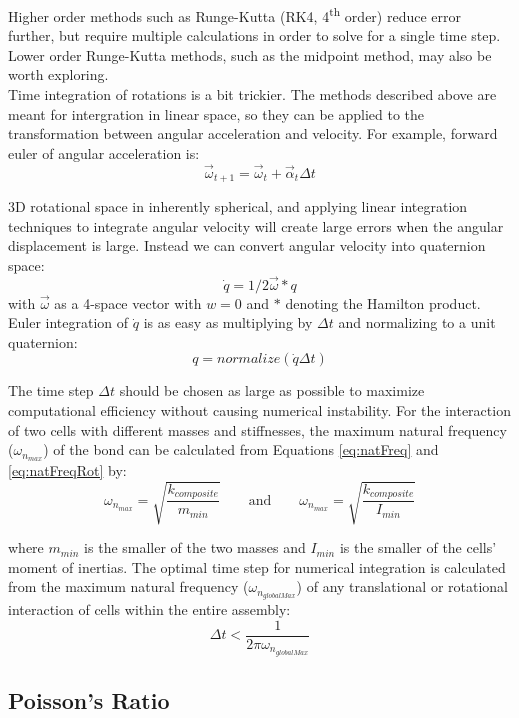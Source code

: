 {Higher order methods such as Runge-Kutta (RK4, 4\textsuperscript{th} order) reduce error further, but require multiple calculations in order to solve for a single time step.  Lower order Runge-Kutta methods, such as the midpoint method, may also be worth exploring.\\

Time integration of rotations is a bit trickier.  The methods described above are meant for intergration in linear space, so they can be applied to the transformation between angular acceleration and velocity.  For example, forward euler of angular acceleration is:
\[ \vec{\omega}_{t+1} = \vec{\omega}_{t} +  \vec{\alpha}_{t}\Delta t\]

3D rotational space in inherently spherical, and applying linear integration techniques to integrate angular velocity will create large errors when the angular displacement is large.  Instead we can convert angular velocity into quaternion space:
\[ \dot{q} = 1/2\vec{\omega}*q\]
with $\vec{\omega}$ as a 4-space vector with $w=0$ and $*$ denoting the Hamilton product.\\

Euler integration of $\dot{q}$ is as easy as multiplying by $\Delta t$ and normalizing to a unit quaternion:
\[ q = normalize(\dot{q}\Delta t)\]

The time step $\Delta t$ should be chosen as large as possible to maximize computational efficiency without causing numerical instability.  For the interaction of two cells with different masses and stiffnesses, the maximum natural frequency ($\omega_{n_{max}}$) of the bond can be calculated from Equations \ref{eq:natFreq} and \ref{eq:natFreqRot} by:
\begin{equation}\label{eq:maxnatFreq}
\omega_{n_{max}} = \sqrt{\dfrac{k_{composite}}{m_{min}}} \qquad
\text{and} \qquad \omega_{n_{max}} = \sqrt{\dfrac{k_{composite}}{I_{min}}} 
\end{equation}

where $m_{min}$ is the smaller of the two masses and $I_{min}$ is the smaller of the cells' moment of inertias.  The optimal time step for numerical integration is calculated from the maximum natural frequency ($\omega_{n_{globalMax}}$) of any translational or rotational interaction of cells within the entire assembly:
\begin{equation}\label{eq:maxDeltaT}
\Delta t < \dfrac{1}{2\pi\omega_{n_{globalMax}}}
\end{equation}

\subsection{Poisson's Ratio}

}
